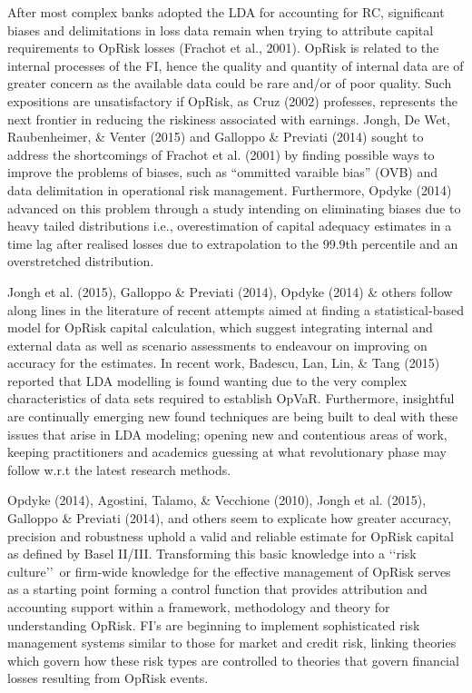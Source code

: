 \documentclass{DissertateUSU}
\begin{document}
After most complex banks adopted the LDA for accounting for RC,
significant biases and delimitations in loss data remain when trying to
attribute capital requirements to OpRisk losses (Frachot et al., 2001).
OpRisk is related to the internal processes of the FI, hence the quality
and quantity of internal data are of greater concern as the available
data could be rare and/or of poor quality. Such expositions are
unsatisfactory if OpRisk, as Cruz (2002) professes, represents the next
frontier in reducing the riskiness associated with earnings. Jongh, De
Wet, Raubenheimer, \& Venter (2015) and Galloppo \& Previati (2014)
sought to address the shortcomings of Frachot et al. (2001) by finding
possible ways to improve the problems of biases, such as ``ommitted
varaible bias'' (OVB) and data delimitation in operational risk
management. Furthermore, Opdyke (2014) advanced on this problem through
a study intending on eliminating biases due to heavy tailed
distributions i.e., overestimation of capital adequacy estimates in a
time lag after realised losses due to extrapolation to the 99.9th
percentile and an overstretched distribution.\medskip

Jongh et al. (2015), Galloppo \& Previati (2014), Opdyke (2014) \&
others follow along lines in the literature of recent attempts aimed at
finding a statistical-based model for OpRisk capital calculation, which
suggest integrating internal and external data as well as scenario
assessments to endeavour on improving on accuracy for the estimates. In
recent work, Badescu, Lan, Lin, \& Tang (2015) reported that LDA
modelling is found wanting due to the very complex characteristics of
data sets required to establish OpVaR. Furthermore, insightful are
continually emerging new found techniques are being built to deal with
these issues that arise in LDA modeling; opening new and contentious
areas of work, keeping practitioners and academics guessing at what
revolutionary phase may follow w.r.t the latest research methods.
\medskip

Opdyke (2014), Agostini, Talamo, \& Vecchione (2010), Jongh et al.
(2015), Galloppo \& Previati (2014), and others seem to explicate how
greater accuracy, precision and robustness uphold a valid and reliable
estimate for OpRisk capital as defined by Basel II/III. Transforming
this basic knowledge into a \lq\lq risk culture\rq\rq~or firm-wide
knowledge for the effective management of OpRisk serves as a starting
point forming a control function that provides attribution and
accounting support within a framework, methodology and theory for
understanding OpRisk. FI's are beginning to implement sophisticated risk
management systems similar to those for market and credit risk, linking
theories which govern how these risk types are controlled to theories
that govern financial losses resulting from OpRisk events. \medskip
\end{document}
